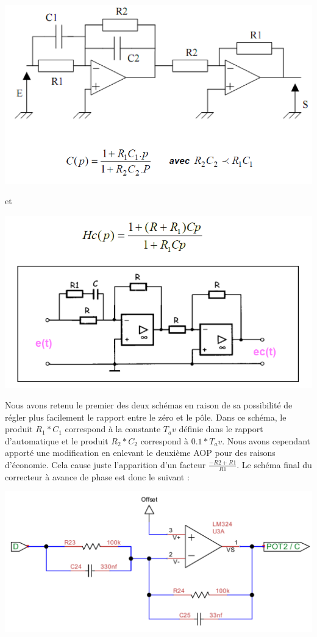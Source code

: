\documentclass[11pt, french]{article} %
\begin{document}
\begin{center}
\includegraphics[width = 15cm]{SolutionAnalogique/Avph.png} 
\end{center}
et
\begin{center}
\includegraphics[width = 15cm]{SolutionAnalogique/Avph2.png}
\end{center}

\vspace{0.5cm}

Nous avons retenu le premier des deux schémas en raison de sa possibilité de régler plus facilement le rapport entre le zéro et le pôle. Dans ce schéma, le produit $R_1*C_1$ correspond à la constante $ T_av$ définie dans le rapport d'automatique et le produit $R_2*C_2$ correspond à $0.1*T_av$. Nous avons cependant apporté une modification en enlevant le deuxième AOP pour des raisons d'économie. Cela cause juste l'apparition d'un facteur $\frac{-R2+R1}{R1}$. Le schéma final du correcteur à avance de phase est donc le suivant :

\begin{center}
\includegraphics[width = 15cm]{SolutionAnalogique/AvPhase.pdf}
\end{center}
\end{document}
